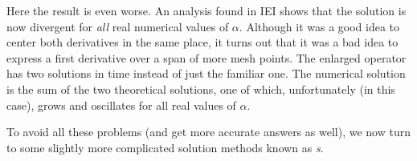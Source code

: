 Here the result is even worse.
An analysis found in IEI
shows that the solution is now divergent for 
{\em  all}
real numerical values of  $\alpha$.
Although it was a good idea to center both derivatives in the same
place, it turns out that it was a bad idea to express a first
derivative over a span of more mesh points. 
The enlarged operator has two solutions in time instead of just the
familiar one. 
The numerical solution is the sum of the two theoretical solutions,
one of which, unfortunately (in this case), grows and oscillates for
all real values of  $\alpha$.
\par
To avoid all these problems (and get more accurate answers as well),
we now turn to some slightly more complicated solution methods known as
{\em  {}s}.
